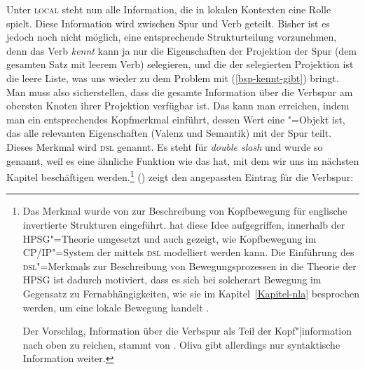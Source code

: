 \noindent
Unter \textsc{local} steht nun alle Information, die in lokalen Kontexten eine Rolle spielt.
Diese Information wird zwischen Spur und Verb geteilt. Bisher ist es jedoch noch nicht möglich,
eine entsprechende Strukturteilung vorzunehmen, denn das Verb \emph{kennt} kann ja nur
die Eigenschaften der Projektion der Spur (dem gesamten Satz mit leerem Verb) selegieren, und die \compsl der selegierten
Projektion ist die leere Liste, was uns wieder zu dem Problem mit (\ref{bsp-kennt-gibt}) bringt. Man
muss also sicherstellen, dass die gesamte Information über die Verbspur am obersten Knoten
ihrer Projektion verfügbar ist. Das kann man erreichen, indem man ein entsprechendes Kopfmerkmal
einführt, dessen Wert eine \local"=Objekt ist, das alle relevanten Eigenschaften (Valenz und
Semantik) mit der Spur teilt. Dieses Merkmal wird \textsc{dsl} genannt. Es steht für \emph{double
  slash} und wurde so genannt, weil es eine ähnliche Funktion wie das \slashm hat, mit dem wir uns
im nächsten Kapitel beschäftigen werden.\footnote{%
  Das Merkmal \dsl wurde von \citet*{Jacobson87} zur Beschreibung von Kopfbewegung 
  für englische invertierte Strukturen eingeführt. \citet{Borsley89}
  hat diese Idee aufgegriffen, innerhalb der HPSG"=Theorie umgesetzt und 
  auch gezeigt, wie Kopfbewegung im CP/IP"=System der \gbt mittels \textsc{dsl} modelliert werden
  kann.
  Die Einführung des \textsc{dsl}"=Merkmals zur Beschreibung von Bewegungsprozessen
  in die Theorie der HPSG ist dadurch motiviert, dass es sich bei solcherart Bewegung
  im Gegensatz zu Fernabhängigkeiten, wie sie im Kapitel~\ref{Kapitel-nla}
  besprochen werden, um eine lokale Bewegung handelt \citep[Abschnitt~3.1]{Frank94b}.

  Der Vorschlag, Information über die Verbspur als Teil der Kopf"|information nach oben zu reichen,
  stammt von \citet[]{Oliva92b}. Oliva gibt allerdings nur syntaktische Information weiter.%
}
() zeigt den angepassten Eintrag für die Verbspur:

